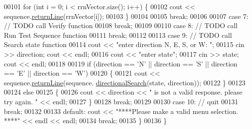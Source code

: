 \begin{DoxyCode}
00101             \textcolor{keywordflow}{for} (\textcolor{keywordtype}{int} i = 0; i < rrnVector.size(); i++) \{
00102                 cout << sequence.\hyperlink{classSSClass_ab0a8ea1af895df28359b5733bd920ef3}{returnLine}(rrnVector[i]);
00103             \}
00104 
00105                 \textcolor{keywordflow}{break};
00106 
00107         \textcolor{keywordflow}{case} 7: \textcolor{comment}{// TODO call Verify function}
00108                 \textcolor{keywordflow}{break};
00109 
00110         \textcolor{keywordflow}{case} 8: \textcolor{comment}{// TODO call Run Test Sequence function}
00111                 \textcolor{keywordflow}{break};
00112 
00113         \textcolor{keywordflow}{case} 9: \textcolor{comment}{// TODO call Search state function}
00114                 cout << \textcolor{stringliteral}{"enter direction N, E, S, or W: "};
00115                 cin >> direction; cout << endl;
00116                 cout << \textcolor{stringliteral}{"enter state"};
00117                 cin >> state; cout << endl;
00118 
00119                 \textcolor{keywordflow}{if} (direction == \textcolor{charliteral}{'N'} || direction == \textcolor{charliteral}{'S'} || direction == \textcolor{charliteral}{'E'} || direction == \textcolor{charliteral}{'W'})
00120                 \{
00121                     cout << sequence.\hyperlink{classSSClass_ab0a8ea1af895df28359b5733bd920ef3}{returnLine}(sequence.
      \hyperlink{classSSClass_ad03c99840c2946a2112f5f1942c287f2}{directionalSearch}(state, direction));
00122                 \}
00123 
00124                 \textcolor{keywordflow}{else}
00125                 \{
00126                     cout << direction << \textcolor{stringliteral}{" is not a valid response. please try again. "} << endl;
00127                 \}
00128                 \textcolor{keywordflow}{break};
00129 
00130         \textcolor{keywordflow}{case} 10: \textcolor{comment}{// quit}
00131                 \textcolor{keywordflow}{break};
00132 
00133         \textcolor{keywordflow}{default}: cout << \textcolor{stringliteral}{"****Please make a valid menu selection. ****"} << endl << endl; 
00134                 \textcolor{keywordflow}{break};
00135     \}
00136 \}
\end{DoxyCode}
